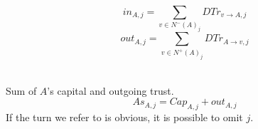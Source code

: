 \documentclass[11pt]{llncs}
\begin{document}
     \begin{definition}
        \begin{equation}
           in_{A, j} = \sum\limits_{v \in N^{-}\left(A\right)_j}DTr_{v \rightarrow A, j}
        \end{equation}
        \begin{equation}
           out_{A, j} = \sum\limits_{v \in N^{+}\left(A\right)_j}DTr_{A \rightarrow v, j}
        \end{equation}
     \end{definition}
     \begin{definition} \ \\
        Sum of $A$'s capital and outgoing trust.
        \begin{equation}
           As_{A, j} = Cap_{A, j} + out_{A, j}
        \end{equation}
        If the turn we refer to is obvious, it is possible to omit $j$.
     \end{definition}
\end{document}
